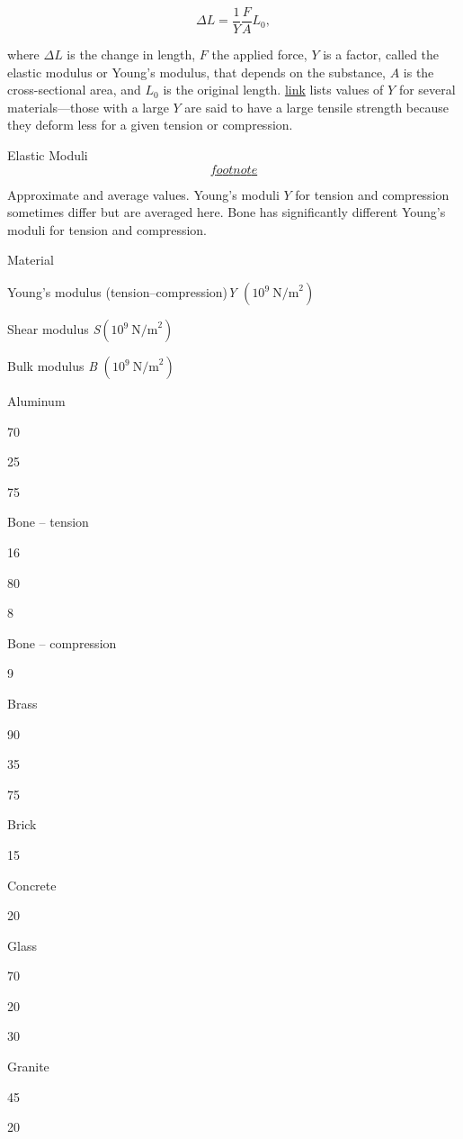 \documentclass[
]{book}
\begin{document}
\leavevmode{}%
\[{{{\Delta L = \frac{1}{Y}}\frac{F}{A}L_{0}},}{}\]

where \({\Delta L}{}\) is the change in length, \(F{}\) the applied force,
\emph{}\(Y{}\) is a factor, called the elastic
modulus or Young's modulus, that depends on the substance,
\emph{}\(A{}\) is the cross-sectional area, and
\emph{}\(L_{0}{}\) is the original length.
\protect\hyperlink{import-auto-id1165298671576}{link} lists
values of \emph{\(Y{}\)} for several materials---those with a large \(Y{}\) are
said to have a large {tensile strength} because they
deform less for a given tension or compression.

{Elastic Moduli\protect\hyperlink{eip-id1325742}{\[footnote\]}}

Approximate and average values. Young's moduli \(Y{}\) for tension and
compression sometimes differ but are averaged here. Bone has
significantly different Young's moduli for tension and compression.

Material

Young's modulus (tension--compression)\emph{Y}
\((\text{10}^{\text{9}}\ \text{N/m}^{\text{2}})\)

Shear modulus \emph{S}\((\text{10}^{\text{9}}\ \text{N/m}^{\text{2}})\)

Bulk modulus \emph{B} \((\text{10}^{\text{9}}\ \text{N/m}^{\text{2}})\)

Aluminum

70

25

75

Bone -- tension

16

80

8

Bone -- compression

9

Brass

90

35

75

Brick

15

Concrete

20

Glass

70

20

30

Granite

45

20
\end{document}
